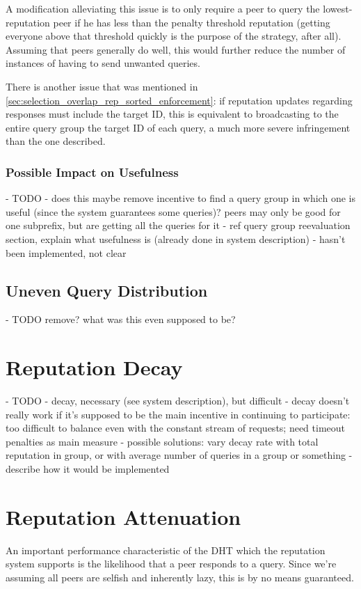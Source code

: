 A modification alleviating this issue is to only require a peer to query the
lowest-reputation peer if he has less than the penalty threshold reputation
(getting everyone above that threshold quickly is the purpose of the strategy,
after all). Assuming that peers generally do well, this would further reduce the
number of instances of having to send unwanted queries.

There is another issue that was mentioned in
\ref{sec:selection_overlap_rep_sorted_enforcement}: if reputation updates
regarding responses must include the target ID, this is equivalent to
broadcasting to the entire query group the target ID of each query, a much more
severe infringement than the one described.

\subsubsection{Possible Impact on Usefulness}
- TODO
- does this maybe remove incentive to find a query group in which one is useful
  (since the system guarantees some queries)? peers may only be good for one
  subprefix, but are getting all the queries for it
- ref query group reevaluation section, explain what usefulness is (already done
  in system description)
- hasn't been implemented, not clear

\subsection{Uneven Query Distribution}
- TODO remove? what was this even supposed to be?

\section{Reputation Decay}
- TODO
- decay, necessary (see system description), but difficult
- decay doesn't really work if it's supposed to be the main incentive in
  continuing to participate: too difficult to balance even with the constant
  stream of requests; need timeout penalties as main measure
- possible solutions: vary decay rate with total reputation in group, or with
  average number of queries in a group or something
- describe how it would be implemented

\section{Reputation Attenuation}
\label{sec:attenuation}
An important performance characteristic of the \ac{DHT} which the reputation
system supports is the likelihood that a peer responds to a query. Since we're
assuming all peers are selfish and inherently lazy, this is by no means
guaranteed.


